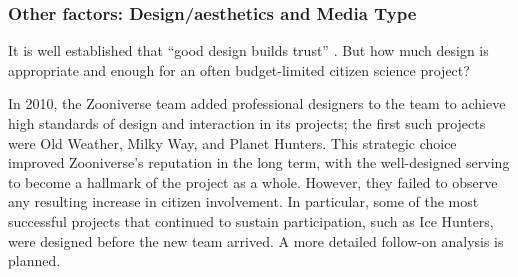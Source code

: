 \documentclass{sigchi}
\begin{document}
\subsubsection{Other factors: Design/aesthetics and Media Type}



It is well established that ``good design builds trust'' \cite{norman2002design}. But how much design is appropriate and enough for an often budget-limited citizen science project?   %

In 2010, the Zooniverse team added professional designers to the team to achieve high standards of design and interaction in its projects; the first such projects were Old Weather, Milky Way, and Planet Hunters.  This strategic choice improved Zooniverse's reputation in the long term, with the well-designed serving to become a hallmark of the project as a whole.  However, they failed to observe any resulting increase in citizen involvement.  In particular, some of the most successful projects that continued to sustain participation, such as Ice Hunters, were designed before the new team arrived.  A more detailed follow-on analysis is planned.

\end{document}
